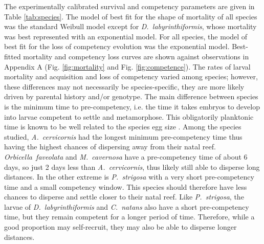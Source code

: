 \documentclass[preprint,12pt,authoryear]{elsarticle}
\begin{document}
	The experimentally calibrated survival and competency parameters are given in Table \ref{tab:species}.  The model of best fit for the shape of mortality of all species was the standard Weibull model except for \textit{D.~labyrinthiformis}, whose mortality was best represented with an exponential model. For all species, the model of best fit for the loss of competency evolution was the exponential model. Best-fitted mortality and competency loss curves are shown against observations in Appendix A (Fig. \ref{fig:mortality} and Fig. \ref{fig:competence}). The rates of larval mortality and acquisition and loss of competency varied among species; however, these differences may not necessarily be species-specific, they are more likely driven by parental history and/or genotype. The main difference between species is the minimum time to pre-competency, i.e. the time it takes embryos to develop into larvae competent to settle and metamorphose. This obligatorily planktonic time is known to be well related to the species egg size \citep{figueiredo2013synthesizing, figueiredo2025predicting}. Among the species studied, \textit{A.~cervicornis} had the longest minimum pre-competency time thus having the highest chances of dispersing away from their natal reef. \textit{Orbicella~faveolata} and \textit{M.~cavernosa} have a pre-competency time of about 6 days, so just 2 days less than \textit{A.~cervicornis}, thus likely still able to disperse long distances. In the other extreme is \textit{P.~strigosa} with a very short pre-competency time and a small competency window. This species should therefore have less chances to disperse and settle closer to their natal reef. Like \textit{P.~strigosa}, the larvae of \textit{D.~labyrinthiformis} and \textit{C.~natans} also have a short pre-competency time, but they remain competent for a longer period of time. Therefore, while a good proportion may self-recruit, they may also be able to disperse longer distances.
	
	
	
	
\end{document}
